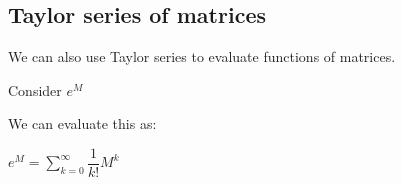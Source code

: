 
\subsection{Taylor series of matrices}

We can also use Taylor series to evaluate functions of matrices.

Consider \(e^M\)

We can evaluate this as:

\(e^M=\sum_{k=0}^\infty \dfrac{1}{k!}M^k\)

